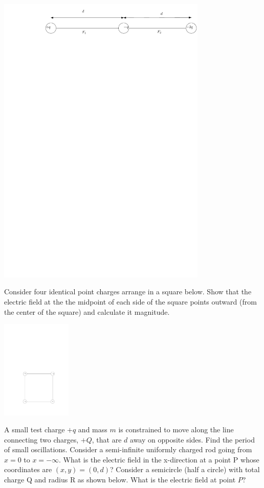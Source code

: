 \documentclass[12pt]{article}
\begin{document}
\includegraphics[width=0.75\textwidth]{3-charges-2.pdf}

\newpage
\noindent Consider four identical point charges arrange in a square below.  Show that the electric field at the the midpoint of each side of the square points outward (from the center of the square) and calculate it magnitude.

\includegraphics[width=0.25\textwidth]{square.pdf}

\newpage
\noindent A small test charge $+q$ and mass $m$ is constrained to move along the line connecting two charges, $+Q$, that are $d$ away on opposite sides.  Find the period of small oscillations.   
\newpage 
\noindent Consider a semi-infinite uniformly charged rod going from $x=0$ to $x=-\infty$.  What is the electric field in the x-direction at a point P whose coordinates are $(x,y)=(0,d)$? 
\newpage
\noindent Consider a semicircle (half a circle) with total charge Q and radius R as shown below.  What is the electric field at point $P$?
\end{document}
